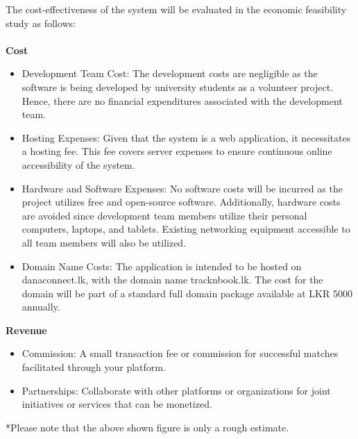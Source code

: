 The cost-effectiveness of the system will be evaluated in the economic feasibility study as follows: \\ \\
\textbf{Cost}
\begin{itemize}
\itemsep0em 
    \item Development Team Cost: The development costs are negligible as the software is being developed by university students as a volunteer project. Hence, there are no financial expenditures associated with the development team.
    \item Hosting Expenses: Given that the system is a web application, it necessitates a hosting fee. This fee covers server expenses to ensure continuous online accessibility of the system.
    \item Hardware and Software Expenses: No software costs will be incurred as the project utilizes free and open-source software. Additionally, hardware costs are avoided since development team members utilize their personal computers, laptops, and tablets. Existing networking equipment accessible to all team members will also be utilized.
    \item Domain Name Costs: The application is intended to be hosted on danaconnect.lk, with the domain name tracknbook.lk. The cost for the domain will be part of a standard full domain package available at LKR 5000 annually.
\end{itemize}
\newpage
\textbf{Revenue}

\begin{itemize}
    \item Commission: A small transaction fee or commission for successful matches facilitated through your platform.
    \item Partnerships: Collaborate with other platforms or organizations for joint initiatives or services that can be monetized.



\end{itemize}
*Please note that the above shown figure is only a rough estimate. \\ 

